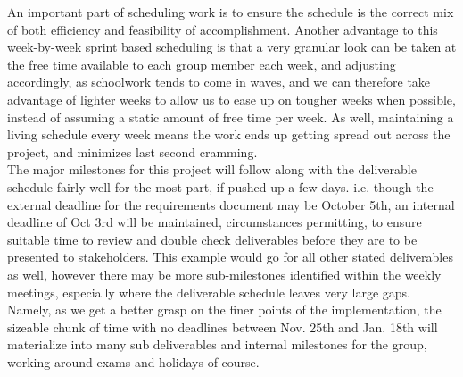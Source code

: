 \documentclass{article}
\begin{document}
	An important part of scheduling work is to ensure the schedule is the correct mix of both efficiency and feasibility of accomplishment. Another advantage to this week-by-week
sprint based scheduling is that a very granular look can be taken at the free time available to each group member each week, and adjusting accordingly, as schoolwork tends
to come in waves, and we can therefore take advantage of lighter weeks to allow us to ease up on tougher weeks when possible, instead of assuming a static amount of free
time per week. As well, maintaining a living schedule every week means the work ends up getting spread out across the project, and minimizes last second cramming.\\

	The major milestones for this project will follow along with the deliverable schedule fairly well for the most part, if pushed up a few days. i.e. though the external deadline
for the requirements document may be October 5th, an internal deadline of Oct 3rd will be maintained, circumstances permitting, to ensure suitable time to review and double
check deliverables before they are to be presented to stakeholders. This example would go for all other stated deliverables as well, however there may be more sub-milestones
identified within the weekly meetings, especially where the deliverable schedule leaves very large gaps. Namely, as we get a better grasp on the finer points of the 
implementation, the sizeable chunk of time with no deadlines between Nov. 25th and Jan. 18th will materialize into many sub deliverables and internal milestones for the group,
working around exams and holidays of course. 
\end{document}
